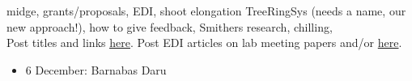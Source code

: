 \documentclass[11pt]{article}
\newenvironment{smitemize}{
\begin{itemize}
  \setlength{\itemsep}{0pt}
  \setlength{\parskip}{0.8pt}
  \setlength{\parsep}{0pt}}
{\end{itemize}
}
\begin{document}
\vspace{6pt}
 midge, grants/proposals, EDI, shoot elongation TreeRingSys (needs a name, our new approach!), how to give feedback, Smithers research, chilling, \\
\vspace{7pt}
 Post titles and links \href{https://docs.google.com/document/d/1j0WdDbjdp8ERLSO7whvtnP-tOblYMlX33TSCXy_uRKo/edit?usp=sharing}{\underline{here}}. Post EDI articles on lab meeting papers and/or  \href{https://docs.google.com/document/d/18VbP-03oD0BsArxYm60g1ZvvFL7IoA3-6rpdHb1eLPw/edit#heading=h.gsqcglkhxkzg}{here}.\\
\iffalse
Lizzie: \emph{Nature}\\
Who: \emph{Ecology Letters, Global Change Biology}\\
Who: \emph{Nature Ecology \& Evolution}\\
OPEN: \emph{PNAS, New Phytologist, Nature Climate Change, Journal of Ecology, Science, TREE, Ecology, Am J of Bot}\\
\fi

\vspace{6pt}
\vspace{-1ex}
\begin{smitemize}
\item 6 December: Barnabas Daru
\end{smitemize}
\end{document}
